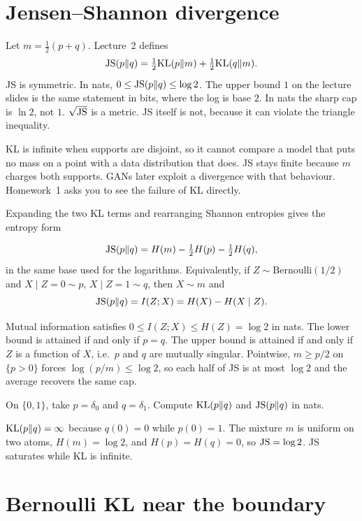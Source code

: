 \section{Jensen--Shannon divergence}

Let $m=\tfrac12(p+q)$. Lecture~2 defines
\[
\mathrm{JS}(p\Vert q)=\tfrac12\mathrm{KL}(p\Vert m)+\tfrac12\mathrm{KL}(q\Vert m).
\]
JS is symmetric. In nats, $0\le \mathrm{JS}(p\Vert q)\le \log 2$. The upper bound $1$ on the lecture slides is the same statement in bits, where the log is base $2$. In nats the sharp cap is $\ln 2$, not $1$. $\sqrt{\mathrm{JS}}$ is a metric. JS itself is not, because it can violate the triangle inequality.

\begin{intbox}
KL is infinite when supports are disjoint, so it cannot compare a model that puts no mass on a point with a data distribution that does. JS stays finite because $m$ charges both supports. GANs later exploit a divergence with that behaviour. Homework~1 asks you to see the failure of KL directly.
\end{intbox}

Expanding the two KL terms and rearranging Shannon entropies gives the entropy form
\begin{resultbox}
\[
\mathrm{JS}(p\Vert q)=H(m)-\tfrac12 H(p)-\tfrac12 H(q),
\]
in the same base used for the logarithms. Equivalently, if $Z\sim\mathrm{Bernoulli}(1/2)$ and $X\mid Z=0\sim p$, $X\mid Z=1\sim q$, then $X\sim m$ and
\[
\mathrm{JS}(p\Vert q)=I(Z;X)=H(X)-H(X\mid Z).
\]
\end{resultbox}
Mutual information satisfies $0\le I(Z;X)\le H(Z)=\log 2$ in nats. The lower bound is attained if and only if $p=q$. The upper bound is attained if and only if $Z$ is a function of $X$, i.e.\ $p$ and $q$ are mutually singular. Pointwise, $m\ge p/2$ on $\{p>0\}$ forces $\log(p/m)\le\log 2$, so each half of JS is at most $\log 2$ and the average recovers the same cap.

\begin{practbox}
On $\{0,1\}$, take $p=\delta_0$ and $q=\delta_1$. Compute $\mathrm{KL}(p\Vert q)$ and $\mathrm{JS}(p\Vert q)$ in nats.
\end{practbox}
\begin{solbox}
$\mathrm{KL}(p\Vert q)=\infty$ because $q(0)=0$ while $p(0)=1$. The mixture $m$ is uniform on two atoms, $H(m)=\log 2$, and $H(p)=H(q)=0$, so $\mathrm{JS}=\log 2$. JS saturates while KL is infinite.
\end{solbox}

\section{Bernoulli KL near the boundary}

